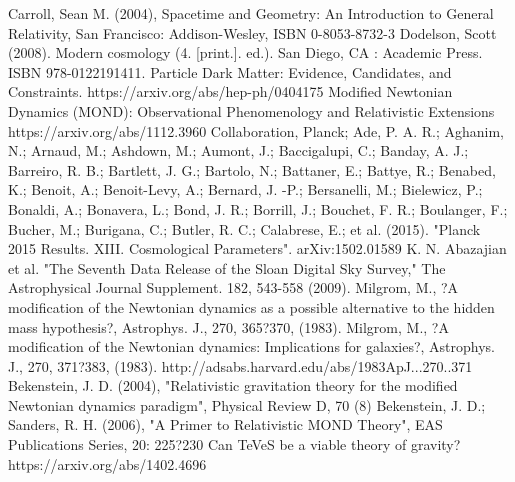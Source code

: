 \documentclass[12pt]{article}
\begin{document}
\begin{thebibliography}{99}
Carroll, Sean M. (2004), Spacetime and Geometry: An Introduction to General Relativity, San Francisco: Addison-Wesley, ISBN 0-8053-8732-3
 Dodelson, Scott (2008). Modern cosmology (4. [print.]. ed.). San Diego, CA : Academic Press. ISBN 978-0122191411.
 Particle Dark Matter: Evidence, Candidates, and Constraints. https://arxiv.org/abs/hep-ph/0404175
Modified Newtonian Dynamics (MOND): Observational Phenomenology and Relativistic Extensions https://arxiv.org/abs/1112.3960
 Collaboration, Planck; Ade, P. A. R.; Aghanim, N.; Arnaud, M.; Ashdown, M.; Aumont, J.; Baccigalupi, C.; Banday, A. J.; Barreiro, R. B.; Bartlett, J. G.; Bartolo, N.; Battaner, E.; Battye, R.; Benabed, K.; Benoit, A.; Benoit-Levy, A.; Bernard, J. -P.; Bersanelli, M.; Bielewicz, P.; Bonaldi, A.; Bonavera, L.; Bond, J. R.; Borrill, J.; Bouchet, F. R.; Boulanger, F.; Bucher, M.; Burigana, C.; Butler, R. C.; Calabrese, E.; et al. (2015). "Planck 2015 Results. XIII. Cosmological Parameters". arXiv:1502.01589
 K. N. Abazajian et al. "The Seventh Data Release of the Sloan Digital Sky Survey," The Astrophysical Journal Supplement. 182, 543-558 (2009).
  Milgrom, M., ?A modification of the Newtonian dynamics as a possible alternative to the
hidden mass hypothesis?, Astrophys. J., 270, 365?370, (1983).
  Milgrom, M., ?A modification of the Newtonian dynamics: Implications for galaxies?, Astrophys.
J., 270, 371?383, (1983).  http://adsabs.harvard.edu/abs/1983ApJ...270..371
 Bekenstein, J. D. (2004), "Relativistic gravitation theory for the modified Newtonian dynamics paradigm", Physical Review D, 70 (8)
Bekenstein, J. D.; Sanders, R. H. (2006), "A Primer to Relativistic MOND Theory", EAS Publications Series, 20: 225?230
 Can TeVeS be a viable theory of gravity? https://arxiv.org/abs/1402.4696
\end{thebibliography}
\end{document}

